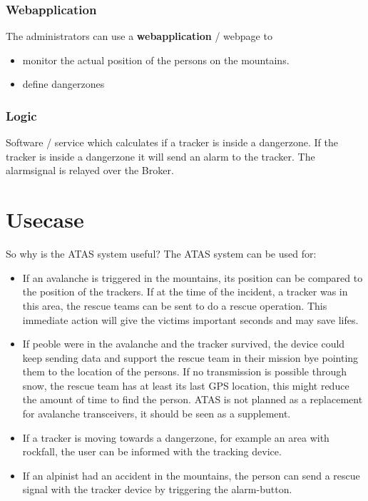 \documentclass[a4paper,11pt, oneside]{report}
\theoremstyle{definition}
\begin{document}
\subsubsection{Webapplication}
The administrators can use a  \textbf{webapplication} / webpage to 
\begin{itemize}
\item
monitor the actual position of the persons on the mountains. 
\item
define dangerzones
\end{itemize}

\subsubsection{Logic}
Software / service which calculates if a tracker is inside a dangerzone. If the tracker is inside a dangerzone it will send an alarm to the tracker. The alarmsignal is relayed over the Broker.

\section{Usecase}
So why is the ATAS system useful?
The ATAS system can be used for:
\begin{itemize}
\item If an avalanche is triggered in the mountains, its position can be compared to the position of the trackers.
If at the time of the incident, a tracker was in this area, the rescue teams can be sent to do a rescue operation. This immediate action will give the victims important seconds and may save lifes.
\item If peoble were in the avalanche and the tracker survived, the device could keep sending data and support the rescue team in their mission bye pointing them to the location of the persons. If no transmission is possible through snow, the rescue team has at least its last GPS location, this might reduce the amount of time to find the person. ATAS is not planned as a replacement for avalanche transceivers, it should be seen as a supplement.
\item
If a tracker is moving towards a dangerzone, for example an area with rockfall, the user can be informed with the tracking device.
\item If an alpinist had an accident in the mountains, the person can send a rescue signal with the tracker device by triggering the alarm-button.
\end{itemize}

\end{document}
